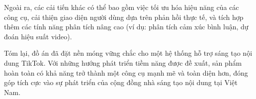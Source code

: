 Ngoài ra, các cải tiến khác có thể bao gồm việc tối ưu hóa hiệu năng của các công cụ, cải thiện giao diện người dùng dựa trên phản hồi thực tế, và tích hợp thêm các tính năng phân tích nâng cao (ví dụ: phân tích cảm xúc bình luận, dự đoán hiệu suất video).

Tóm lại, đồ án đã đặt nền móng vững chắc cho một hệ thống hỗ trợ sáng tạo nội dung TikTok. Với những hướng phát triển tiềm năng được đề xuất, sản phẩm hoàn toàn có khả năng trở thành một công cụ mạnh mẽ và toàn diện hơn, đóng góp tích cực vào sự phát triển của cộng đồng nhà sáng tạo nội dung tại Việt Nam.
